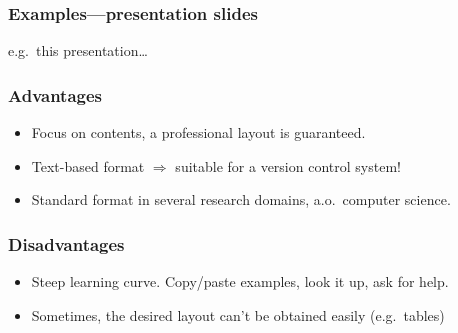 \documentclass{beamer}
\begin{document}
\begin{frame}
  \frametitle{Examples---presentation slides}

  \begin{center}
  e.g.~this presentation\ldots
  \end{center}

\end{frame}

\begin{frame}
  \frametitle{Advantages}

  \begin{itemize}
    \item<+-> Focus on contents, a professional layout is guaranteed.
    \item<+-> Text-based format $\Rightarrow$ suitable for a version control system!
    \item<+-> Standard format in several research domains, a.o.~computer science.
  \end{itemize}
\end{frame}


\begin{frame}
  \frametitle{Disadvantages}

  \begin{itemize}
    \item<+-> Steep learning curve. Copy/paste examples, look it up, ask for help.
    \item<+-> Sometimes, the desired layout can't be obtained easily (e.g.~tables)
  \end{itemize}

\end{frame}
\end{document}

